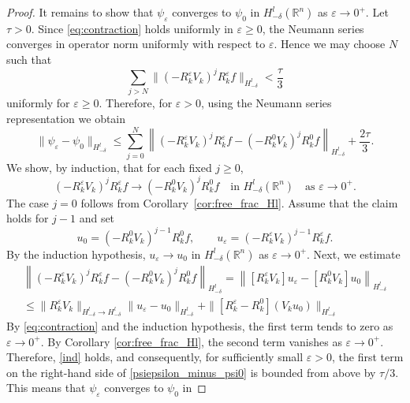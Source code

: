 \documentclass[12pt,a4paper]{amsart}
\numberwithin{equation}{section}
\theoremstyle{plain}
\theoremstyle{definition}
\begin{document}
\begin{proof}
    It remains to show that $\psi_\varepsilon$ converges to $\psi_0$ in $H^l_{-\delta}(\mathbb{R}^n)$ as $\varepsilon \to 0^+$. Let $\tau > 0$. Since \eqref{eq:contraction} holds uniformly in $\varepsilon \geq 0$, the Neumann series converges in operator norm uniformly with respect to $\varepsilon$. Hence we may choose $N$ such that
    \begin{equation}\label{eq:tail}
        \sum_{j > N} \|(-R_k^\varepsilon V_k)^j R_k^\varepsilon f\|_{H^l_{-\delta}}
        < \frac{\tau}{3}
    \end{equation}
    uniformly for $\varepsilon\geq 0$. Therefore, for $\varepsilon  >0$, using the Neumann series
    representation we obtain
    \begin{equation}\label{psiepsilon_minus_psi0}
        \|\psi_\varepsilon - \psi_0\|_{H^l_{-\delta}}
        \leq
        \sum_{j=0}^N
        \left\| (-R_k^\varepsilon V_k)^j R_k^\varepsilon f
        -
        (-R_k^0 V_k)^j R_k^0 f \right\|_{H^l_{-\delta}} + \frac{2\tau}{3}.
    \end{equation}
    We show, by induction, that for each fixed $j \geq 0$,
    \begin{equation}\label{ind}
        (-R_k^\varepsilon V_k)^j R_k^\varepsilon f
        \to
        (-R_k^0 V_k)^j R_k^0 f
        \quad \text{in } H^l_{-\delta}(\mathbb{R}^n)
        \quad \text{as } \varepsilon \to 0^+.
    \end{equation}
    The case $j=0$ follows from Corollary~\ref{cor:free_frac_Hl}. Assume that the claim holds for $j-1$ and set
    \begin{equation*}
        u_0
        =
        (-R_k^0 V_k)^{j-1} R_k^0 f,
        \qquad
        u_\varepsilon
        =
        (-R_k^\varepsilon V_k)^{j-1} R_k^\varepsilon f.
    \end{equation*}
    By the induction hypothesis, $u_\varepsilon \to u_0$ in $H^l_{-\delta}(\mathbb{R}^n)$ as $\varepsilon\to 0^+$. Next, we estimate
    \begin{multline*}
        \left\| (-R_k^\varepsilon V_k)^j R_k^\varepsilon f
        -
        (-R_k^0 V_k)^j R_k^0 f \right\|_{H^l_{-\delta}} = \left\| [R_k^\varepsilon V_k] u_\varepsilon
        -
        [R_k^0 V_k]u_0 \right\|_{H^l_{-\delta}}\\
        \leq \|R_k^\varepsilon V_k\|_{H^l_{-\delta} \to H^l_{-\delta}} \|u_\varepsilon - u_0\|_{H^l_{-\delta}} + \|[R_k^\varepsilon - R_k^0](V_k u_0)\|_{H^l_{-\delta}}
    \end{multline*}
    By \eqref{eq:contraction} and the induction hypothesis, the first term tends to zero as $\varepsilon\to 0^+$. By Corollary \ref{cor:free_frac_Hl}, the second term vanishes as $\varepsilon\to 0^+$. Therefore, \eqref{ind} holds, and consequently, for sufficiently small $\varepsilon>0$, the first term on the right-hand side of \eqref{psiepsilon_minus_psi0} is bounded from above by $\tau/3$. This means that $\psi_\varepsilon$ converges to $\psi_0$ in

\end{proof}
\end{document}
